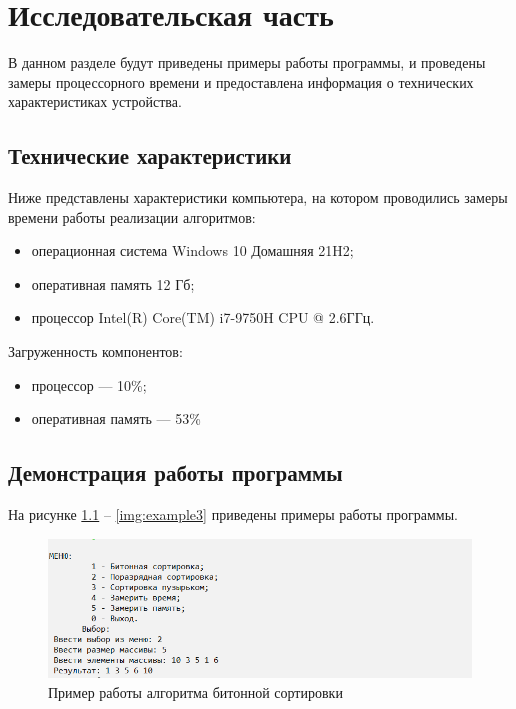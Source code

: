 \chapter{Исследовательская часть}

В данном разделе будут приведены примеры работы программы, и проведены замеры процессорного времени и предоставлена информация о технических характеристиках устройства.

\section{Технические характеристики}

Ниже представлены характеристики компьютера, на котором проводились замеры времени работы реализации алгоритмов:

\begin{itemize}
	\item операционная система Windows 10 Домашняя 21H2;
	\item оперативная память 12 Гб;
	\item процессор Intel(R) Core(TM) i7-9750H CPU @ 2.6ГГц.
\end{itemize}

Загруженность компонентов:

\begin{itemize}
	\item процессор --- 10\%;
	\item оперативная память --- 53\%
\end{itemize}

\clearpage

\section{Демонстрация работы программы}

На рисунке \ref{img:example} -- \ref{img:example3} приведены примеры работы программы.

\begin{figure}[h]
	\begin{center}
		\includegraphics[scale=0.7]{img/example.png}
	\end{center}
	\captionsetup{justification=centering}
	\caption{Пример работы алгоритма битонной сортировки}
	\label{img:example}
\end{figure}


